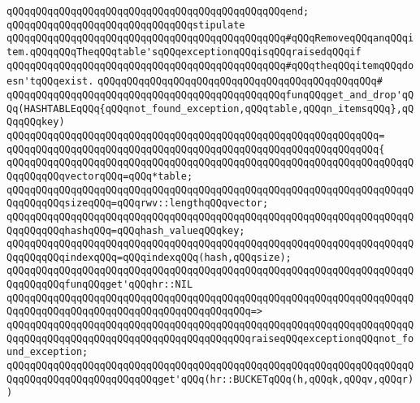 \verb|qQQqqQQqqQQqqQQqqQQqqQQqqQQqqQQqqQQqqQQqqQQqqQQqend;|\newline
\newline
\verb|qQQqqQQqqQQqqQQqqQQqqQQqqQQqqQQqstipulate|\newline
\verb|qQQqqQQqqQQqqQQqqQQqqQQqqQQqqQQqqQQqqQQqqQQqqQQq#qQQqRemoveqQQqanqQQqitem.qQQqqQQqTheqQQqtable'sqQQqexceptionqQQqisqQQqraisedqQQqif|\newline
\verb|qQQqqQQqqQQqqQQqqQQqqQQqqQQqqQQqqQQqqQQqqQQqqQQq#qQQqtheqQQqitemqQQqdoesn'tqQQqexist.|\newline
\verb|qQQqqQQqqQQqqQQqqQQqqQQqqQQqqQQqqQQqqQQqqQQqqQQq#|\newline
\verb|qQQqqQQqqQQqqQQqqQQqqQQqqQQqqQQqqQQqqQQqqQQqqQQqfunqQQqget_and_drop'qQQq(HASHTABLEqQQq{qQQqnot_found_exception,qQQqtable,qQQqn_itemsqQQq},qQQqqQQqkey)|\newline
\verb|qQQqqQQqqQQqqQQqqQQqqQQqqQQqqQQqqQQqqQQqqQQqqQQqqQQqqQQqqQQqqQQq=|\newline
\verb|qQQqqQQqqQQqqQQqqQQqqQQqqQQqqQQqqQQqqQQqqQQqqQQqqQQqqQQqqQQqqQQq{|\newline
\verb|qQQqqQQqqQQqqQQqqQQqqQQqqQQqqQQqqQQqqQQqqQQqqQQqqQQqqQQqqQQqqQQqqQQqqQQqqQQqqQQqvectorqQQq=qQQq*table;|\newline
\verb|qQQqqQQqqQQqqQQqqQQqqQQqqQQqqQQqqQQqqQQqqQQqqQQqqQQqqQQqqQQqqQQqqQQqqQQqqQQqqQQqsizeqQQq=qQQqrwv::lengthqQQqvector;|\newline
\verb|qQQqqQQqqQQqqQQqqQQqqQQqqQQqqQQqqQQqqQQqqQQqqQQqqQQqqQQqqQQqqQQqqQQqqQQqqQQqqQQqhashqQQq=qQQqhash_valueqQQqkey;|\newline
\verb|qQQqqQQqqQQqqQQqqQQqqQQqqQQqqQQqqQQqqQQqqQQqqQQqqQQqqQQqqQQqqQQqqQQqqQQqqQQqqQQqindexqQQq=qQQqindexqQQq(hash,qQQqsize);|\newline
\newline
\verb|qQQqqQQqqQQqqQQqqQQqqQQqqQQqqQQqqQQqqQQqqQQqqQQqqQQqqQQqqQQqqQQqqQQqqQQqqQQqqQQqfunqQQqget'qQQqhr::NIL|\newline
\verb|qQQqqQQqqQQqqQQqqQQqqQQqqQQqqQQqqQQqqQQqqQQqqQQqqQQqqQQqqQQqqQQqqQQqqQQqqQQqqQQqqQQqqQQqqQQqqQQqqQQqqQQqqQQqqQQq=>|\newline
\verb|qQQqqQQqqQQqqQQqqQQqqQQqqQQqqQQqqQQqqQQqqQQqqQQqqQQqqQQqqQQqqQQqqQQqqQQqqQQqqQQqqQQqqQQqqQQqqQQqqQQqqQQqqQQqqQQqraiseqQQqexceptionqQQqnot_found_exception;|\newline
\newline
\verb|qQQqqQQqqQQqqQQqqQQqqQQqqQQqqQQqqQQqqQQqqQQqqQQqqQQqqQQqqQQqqQQqqQQqqQQqqQQqqQQqqQQqqQQqqQQqqQQqget'qQQq(hr::BUCKETqQQq(h,qQQqk,qQQqv,qQQqr))|\newline
